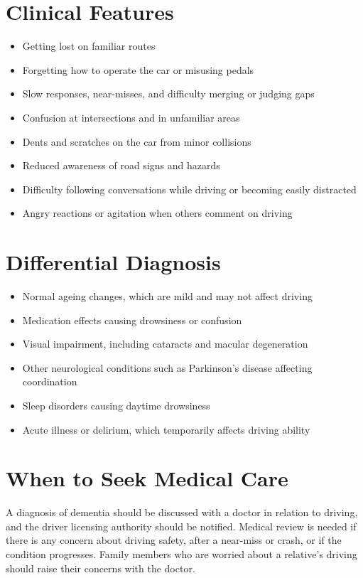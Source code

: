 \section*{Clinical Features}
\begin{itemize}
    \item Getting lost on familiar routes
    \item Forgetting how to operate the car or misusing pedals
    \item Slow responses, near-misses, and difficulty merging or judging gaps
    \item Confusion at intersections and in unfamiliar areas
    \item Dents and scratches on the car from minor collisions
    \item Reduced awareness of road signs and hazards
    \item Difficulty following conversations while driving or becoming easily distracted
    \item Angry reactions or agitation when others comment on driving
\end{itemize}

\section*{Differential Diagnosis}
\begin{itemize}
    \item Normal ageing changes, which are mild and may not affect driving
    \item Medication effects causing drowsiness or confusion
    \item Visual impairment, including cataracts and macular degeneration
    \item Other neurological conditions such as Parkinson's disease affecting coordination
    \item Sleep disorders causing daytime drowsiness
    \item Acute illness or delirium, which temporarily affects driving ability
\end{itemize}

\section*{When to Seek Medical Care}
A diagnosis of dementia should be discussed with a doctor in relation to driving, and the driver licensing authority should be notified. Medical review is needed if there is any concern about driving safety, after a near-miss or crash, or if the condition progresses. Family members who are worried about a relative's driving should raise their concerns with the doctor.

